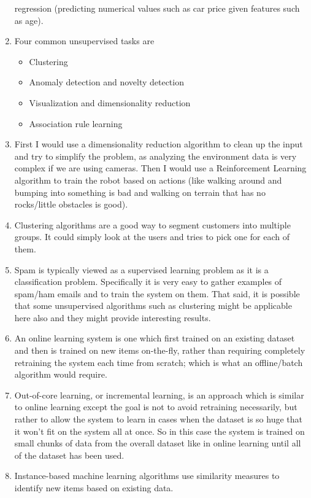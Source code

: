 \documentclass[12pt]{article}
\begin{document}
\begin{enumerate}[label=\arabic*]
        regression (predicting numerical values such as car price given features such as age).
  \item Four common unsupervised tasks are
        \begin{itemize}
          \item Clustering
          \item Anomaly detection and novelty detection
          \item Visualization and dimensionality reduction
          \item Association rule learning
        \end{itemize}
  \item First I would use a dimensionality reduction algorithm to clean up the input and try to simplify the problem, as
        analyzing the environment data is very complex if we are using cameras. Then I would use a Reinforcement Learning
        algorithm to train the robot based on actions (like walking around and bumping into something is bad and walking
        on terrain that has no rocks/little obstacles is good).
  \item Clustering algorithms are a good way to segment customers into multiple groups. It could simply look at the users and tries to pick
        one for each of them.
  \item Spam is typically viewed as a supervised learning problem as it is a classification problem. Specifically it is very easy
        to gather examples of spam/ham emails and to train the system on them. That said, it is possible that some
        unsupervised algorithms such as clustering might be applicable here also and they might provide interesting results.
  \item An online learning system is one which first trained on an existing dataset and then is trained on new items on-the-fly, rather
        than requiring completely retraining the system each time from scratch; which is what an offline/batch algorithm would require.
  \item Out-of-core learning, or incremental learning, is an approach which is similar to online learning except the goal
        is not to avoid retraining necessarily, but rather to allow the system to learn in cases when the dataset is so huge
        that it won't fit on the system all at once. So in this case the system is trained on small chunks of data from the overall dataset
        like in online learning until all of the dataset has been used.
  \item Instance-based machine learning algorithms use similarity measures to identify new items based on existing data.

\end{enumerate}
\end{document}
